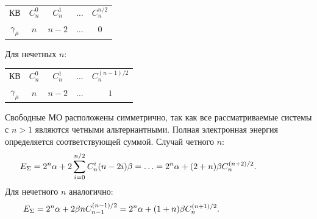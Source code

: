 \begin{tabular}{ |c|c|c|c|c| }
 КВ & $C_n^0$ & $C_n^1$ & $\ldots$ & $C_n^{n/2}$ \\
 $\gamma_{\mu}$ & $n$ & $n-2$ & $\ldots$ & $0$ \\
\end{tabular}
\par
\vspace{-\parskip}
\vspace{3mm}
Для нечетных $n$:
\par
\vspace{-\parskip}
\vspace{2mm}
\hspace{8mm}
\begin{tabular}{ |c|c|c|c|c| }
 КВ & $C_n^0$ & $C_n^1$ & $\ldots$ & $C_n^{(n-1)/2}$ \\
 $\gamma_{\mu}$ & $n$ & $n-2$ & $\ldots$ & $1$ \\
\end{tabular}\par
\vspace{-\parskip}
\vspace{2mm}
Свободные МО расположены симметрично, так как все рассматриваемые системы с $n > 1$ являются четными альтернантными. Полная электронная энергия определяется соответствующей суммой. Случай четного $n$:
\begin{equation*}
\begin{aligned}
& E_{\Sigma}=2^n \alpha+2\sum_{i=0}^{n/2} C_n^i (n-2i)\beta = \ldots = 2^n \alpha + (2+n)\beta C_n^{(n+2)/2}.\hspace{13mm}
\end{aligned}
\end{equation*}
Для нечетного $n$ аналогично:
\begin{equation*}
\begin{aligned}
& E_{\Sigma}= 2^n \alpha + 2\beta n C_{n-1}^{(n-1)/2} = 2^n \alpha + (1+n) \beta C_{n}^{(n+1)/2}.\hspace{27mm}
\end{aligned}
\end{equation*}
\par
\vspace{-\parskip}

